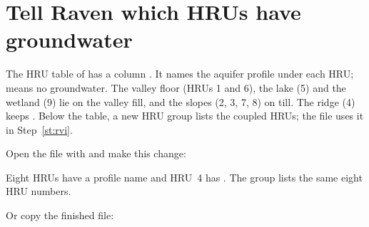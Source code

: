 \section{Tell Raven which HRUs have groundwater}

\label{st:rvh}
The HRU table of  has a column . It names the aquifer profile under each HRU;
\cmd{[NONE]} means no groundwater. The valley floor (HRUs 1 and 6), the lake (5) and the wetland (9) lie on the valley
fill, and the slopes (2, 3, 7, 8) on till. The ridge (4) keeps \cmd{[NONE]}. Below the table, a new HRU group
 lists the coupled HRUs; the  file uses it in Step~\ref{st:rvi}.

Open the file with  and make this change:
\begin{tocheck}
Eight HRUs have a profile name and HRU~4 has \cmd{[NONE]}. The group lists the same eight HRU numbers.
\end{tocheck}
Or copy the finished file: 
